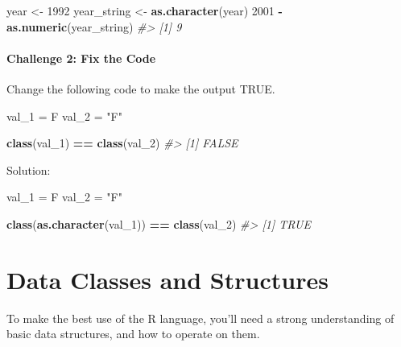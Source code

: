 \documentclass[]{book}
\newenvironment{Shaded}{\begin{snugshade}}{\end{snugshade}}
\newcommand{\KeywordTok}[1]{\textcolor[rgb]{0.13,0.29,0.53}{\textbf{#1}}}
\newcommand{\DecValTok}[1]{\textcolor[rgb]{0.00,0.00,0.81}{#1}}
\newcommand{\StringTok}[1]{\textcolor[rgb]{0.31,0.60,0.02}{#1}}
\newcommand{\CommentTok}[1]{\textcolor[rgb]{0.56,0.35,0.01}{\textit{#1}}}
\newcommand{\OperatorTok}[1]{\textcolor[rgb]{0.81,0.36,0.00}{\textbf{#1}}}
\newcommand{\NormalTok}[1]{#1}
\begin{document}
\begin{Shaded}
\begin{Highlighting}[]
\NormalTok{year <-}\StringTok{ }\DecValTok{1992}
\NormalTok{year_string <-}\StringTok{ }\KeywordTok{as.character}\NormalTok{(year)}
\DecValTok{2001} \OperatorTok{-}\StringTok{ }\KeywordTok{as.numeric}\NormalTok{(year_string)}
\CommentTok{#> [1] 9}
\end{Highlighting}
\end{Shaded}

\subsubsection*{Challenge 2: Fix the
Code}\label{challenge-2-fix-the-code}

Change the following code to make the output TRUE.

\begin{Shaded}
\begin{Highlighting}[]
\NormalTok{val_}\DecValTok{1}\NormalTok{ =}\StringTok{ }\NormalTok{F}
\NormalTok{val_}\DecValTok{2}\NormalTok{ =}\StringTok{ "F"}

\KeywordTok{class}\NormalTok{(val_}\DecValTok{1}\NormalTok{) }\OperatorTok{==}\StringTok{ }\KeywordTok{class}\NormalTok{(val_}\DecValTok{2}\NormalTok{)}
\CommentTok{#> [1] FALSE}
\end{Highlighting}
\end{Shaded}

Solution:

\begin{Shaded}
\begin{Highlighting}[]
\NormalTok{val_}\DecValTok{1}\NormalTok{ =}\StringTok{ }\NormalTok{F}
\NormalTok{val_}\DecValTok{2}\NormalTok{ =}\StringTok{ "F"}

\KeywordTok{class}\NormalTok{(}\KeywordTok{as.character}\NormalTok{(val_}\DecValTok{1}\NormalTok{)) }\OperatorTok{==}\StringTok{ }\KeywordTok{class}\NormalTok{(val_}\DecValTok{2}\NormalTok{)}
\CommentTok{#> [1] TRUE}
\end{Highlighting}
\end{Shaded}

\chapter{Data Classes and Structures}\label{data-classes-and-structures}

To make the best use of the R language, you'll need a strong
understanding of basic data structures, and how to operate on them.
\end{document}
